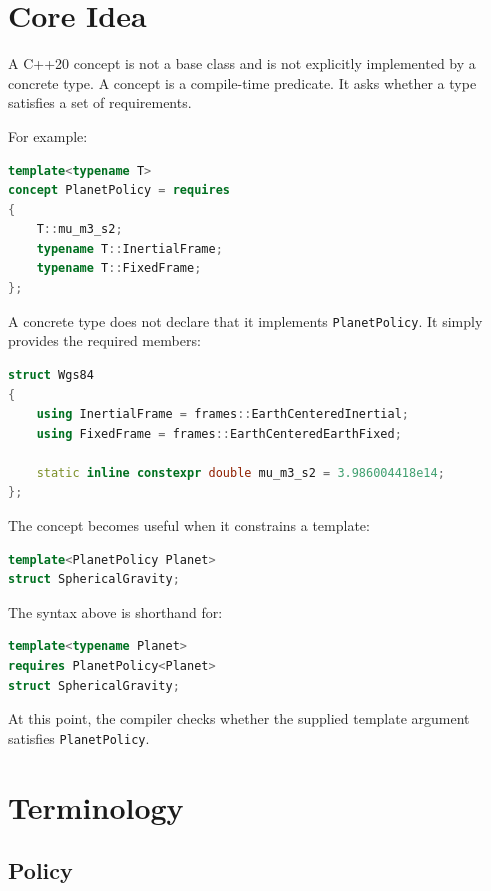 \documentclass[11pt]{article}
\begin{document}
\section{Core Idea}

A C++20 concept is not a base class and is not explicitly implemented by a
concrete type. A concept is a compile-time predicate. It asks whether a type
satisfies a set of requirements.

For example:

\begin{lstlisting}[language=C++]
template<typename T>
concept PlanetPolicy = requires
{
    T::mu_m3_s2;
    typename T::InertialFrame;
    typename T::FixedFrame;
};
\end{lstlisting}

A concrete type does not declare that it implements \texttt{PlanetPolicy}. It
simply provides the required members:

\begin{lstlisting}[language=C++]
struct Wgs84
{
    using InertialFrame = frames::EarthCenteredInertial;
    using FixedFrame = frames::EarthCenteredEarthFixed;

    static inline constexpr double mu_m3_s2 = 3.986004418e14;
};
\end{lstlisting}

The concept becomes useful when it constrains a template:

\begin{lstlisting}[language=C++]
template<PlanetPolicy Planet>
struct SphericalGravity;
\end{lstlisting}

The syntax above is shorthand for:

\begin{lstlisting}[language=C++]
template<typename Planet>
requires PlanetPolicy<Planet>
struct SphericalGravity;
\end{lstlisting}

At this point, the compiler checks whether the supplied template argument
satisfies \texttt{PlanetPolicy}.

\section{Terminology}

\subsection{Policy}
\end{document}
